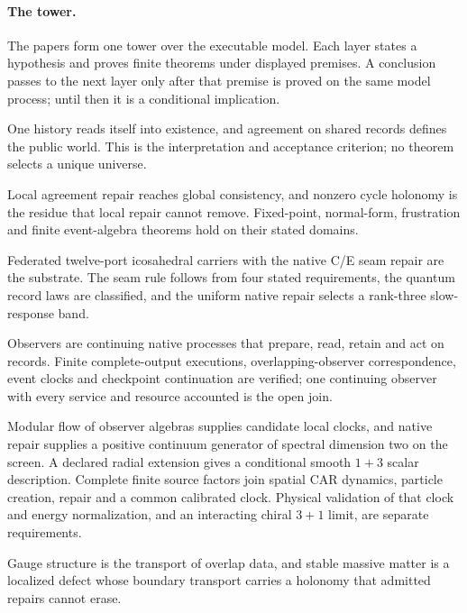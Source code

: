 \paragraph{The tower.}
The papers form one tower over the executable model. Each layer states a
hypothesis and proves finite theorems under displayed premises. A conclusion
passes to the next layer only after that premise is proved on the same
model process; until then it is a conditional implication.
\begin{description}\setlength{\itemsep}{2pt}
\item[0. Closure and agreement.] One history reads itself into existence, and
  agreement on shared records defines the public world. This is the
  interpretation and acceptance criterion; no theorem selects a unique
  universe.
\item[1. Repair mathematics.] Local agreement repair reaches global
  consistency, and nonzero cycle holonomy is the residue that local repair
  cannot remove. Fixed-point, normal-form, frustration and finite
  event-algebra theorems hold on their stated domains.
\item[2. Carrier and repair law.] Federated twelve-port icosahedral carriers
  with the native C/E seam repair are the substrate. The seam rule follows
  from four stated requirements, the quantum record laws are classified, and
  the uniform native repair selects a rank-three slow-response band.
\item[3. Executable observer.] Observers are continuing native processes that
  prepare, read, retain and act on records. Finite complete-output
  executions, overlapping-observer correspondence, event clocks and
  checkpoint continuation are verified; one continuing observer with every
  service and resource accounted is the open join.
\item[4. Clocks and fields.] Modular flow of observer algebras supplies
  candidate local clocks, and native repair supplies a positive continuum
  generator of spectral dimension two on the screen. A declared radial
  extension gives a conditional smooth \(1+3\) scalar description. Complete
  finite source factors join spatial CAR dynamics, particle creation,
  repair and a common calibrated clock. Physical validation of that clock
  and energy normalization, and an interacting chiral \(3+1\) limit, are
  separate requirements.
\item[5. Gauge structure and matter.] Gauge structure is the transport of
  overlap data, and stable massive matter is a localized defect whose
  boundary transport carries a holonomy that admitted repairs cannot erase.

\end{description}
